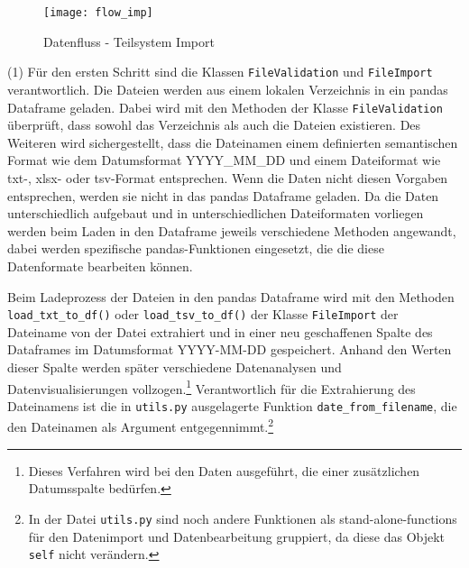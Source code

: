     \begin{figure}[H]
        \centering
            \texttt{[image: flow\_imp]}
            \caption{Datenfluss - Teilsystem Import}
            \label{fig:flow import}
    \end{figure}

    
    (1) Für den ersten Schritt sind die Klassen \texttt{FileValidation} und \texttt{FileImport} verantwortlich.
    Die Dateien werden aus einem lokalen Verzeichnis in ein pandas Dataframe geladen. 
    Dabei wird mit den Methoden der Klasse \texttt{FileValidation} überprüft, dass sowohl das Verzeichnis als auch die Dateien existieren. 
    Des Weiteren wird sichergestellt, dass die Dateinamen einem definierten semantischen Format wie dem Datumsformat YYYY\_MM\_DD und 
    einem Dateiformat wie txt-, xlsx- oder tsv-Format entsprechen. Wenn die Daten nicht diesen Vorgaben entsprechen, werden sie nicht in
    das pandas Dataframe geladen. Da die Daten unterschiedlich aufgebaut und in unterschiedlichen Dateiformaten vorliegen 
    werden beim Laden in den Dataframe jeweils verschiedene Methoden angewandt, dabei werden spezifische pandas-Funktionen eingesetzt,
    die die diese Datenformate bearbeiten können. 
    
    Beim Ladeprozess der Dateien in den pandas Dataframe wird mit den Methoden \texttt{load\_txt\_to\_df()} oder \texttt{load\_tsv\_to\_df()} 
    der Klasse \texttt{FileImport} der Dateiname von der Datei extrahiert und in einer neu geschaffenen Spalte des Dataframes im Datumsformat YYYY-MM-DD gespeichert.
    Anhand den Werten dieser Spalte werden später verschiedene Datenanalysen und Datenvisualisierungen vollzogen.\footnote{Dieses Verfahren wird bei den Daten ausgeführt, die einer zusätzlichen Datumsspalte bedürfen.} 
    Verantwortlich für die Extrahierung des Dateinamens ist die in \texttt{utils.py} ausgelagerte Funktion \texttt{date\_from\_filename},
    die den Dateinamen als Argument entgegennimmt.\footnote{In der Datei \texttt{utils.py} sind noch andere Funktionen als stand-alone-functions für den Datenimport und Datenbearbeitung gruppiert,
    da diese das Objekt \texttt{self} nicht verändern.} 
    
